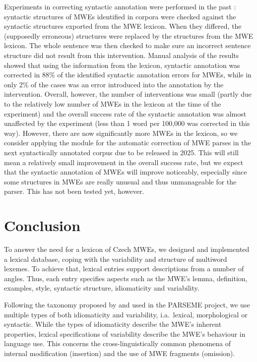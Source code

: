 \documentclass[output=paper,colorlinks,citecolor=brown]{langscibook}
\begin{document}
Experiments in correcting syntactic annotation were performed in the past \citep{Jelinek:2019}: syntactic structures of MWEs identified in corpora were checked against the syntactic structures exported from the MWE lexicon. When they differed, the (supposedly erroneous) structures were replaced by the structures from the MWE lexicon. The whole sentence was then checked to make sure an incorrect sentence structure did not result from this intervention.
Manual analysis of the results showed that using the information from the lexicon, syntactic annotation was corrected in 88\% of the identified syntactic annotation errors for MWEs, while in only 2\% of the cases was an error introduced into the annotation by the intervention. Overall, however, the number of interventions was small (partly due to the relatively low number of MWEs in the lexicon at the time of the experiment) and the overall success rate of the syntactic annotation was almost unaffected by the experiment (less than 1 word per 100,000 was corrected in this way). However, there are now significantly more MWEs in the lexicon, so we consider applying the module for the automatic correction of MWE parses in the next syntactically annotated corpus due to be released in 2025. This will still mean a relatively small improvement in the overall success rate, but we expect that the syntactic annotation of MWEs will improve noticeably, especially since some structures in MWEs are really unusual and thus unmanageable for the parser. This has not been tested yet, however.


\section{Conclusion}
\label{sec:concl}

To answer the need for a lexicon of Czech MWEs, we designed and implemented a lexical database, coping with the variability and structure of multiword lexemes. To achieve that, lexical entries support descriptions from a number of angles. Thus, each entry specifies aspects such as the MWE's lemma, definition, examples, style, syntactic structure, idiomaticity and variability.

Following the taxonomy proposed by \citet{baldwin2010multiword} and used in the PARSEME project, we use multiple types of both idiomaticity and variability, i.a.\ lexical, morphological or syntactic. While the types of idiomaticity describe the MWE's inherent properties, lexical specifications of variability describe the MWE's behaviour in language use. This concerns the cross-linguistically common phenomena of internal modification (insertion) and the use of MWE fragments (omission). 
\end{document}
